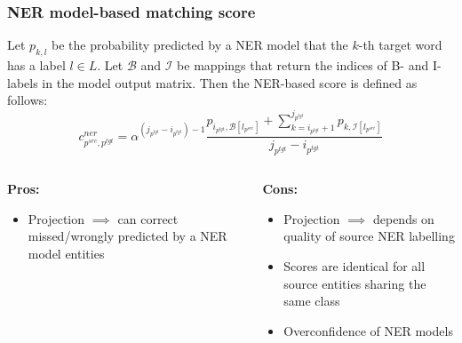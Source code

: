 \documentclass{beamer}
\newcommand{\src}[1]{#1^{src}}
\newcommand{\tgt}[1]{#1^{tgt}}
\begin{document}
\begin{frame}
  \frametitle{NER model-based matching score}
  Let \( p_{k,l} \) be the probability predicted by a NER model that the \( k \)-th
  target word has a label \( l \in L \). Let \( \mathcal{B} \) and \( \mathcal{I} \) be
  mappings that return the indices of B- and I- labels in the model output matrix.
  Then the NER-based score is defined as follows:
  \begin{equation*}
    c_{\src{p}, \tgt{p}}^{ner} = \alpha^{(j_{\tgt{p}} - i_{\tgt{p}}) - 1}
    \frac{
      p_{i_{\tgt{p}}, \mathcal{B}[l_{\src{p}}]} +
      \sum\limits_{k = i_{\tgt{p}} + 1}^{j_{\tgt{p}}} p_{k, \mathcal{I}[l_{\src{p}}]}
    }
    {j_{\tgt{p}} - i_{\tgt{p}}}
  \end{equation*}

  \vspace*{0.2cm}
  \begin{columns}
    \begin{column}[t]{.5\textwidth}
      \centering \textbf{Pros:}
      \begin{itemize}
        \item Projection \( \implies \) can correct missed/wrongly predicted by a
          NER model entities
      \end{itemize}
    \end{column}
    \begin{column}[t]{.5\textwidth}
      \centering \textbf{Cons:}
      \begin{itemize}
        \item Projection \( \implies \) depends on quality of source NER labelling
        \item Scores are identical for all source entities sharing the same class
        \item Overconfidence of NER models
      \end{itemize}
    \end{column}
  \end{columns}
\end{frame}
\end{document}
